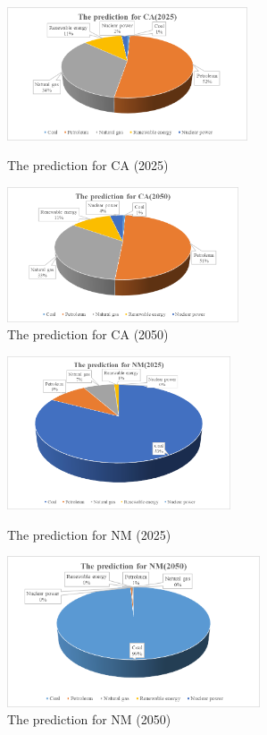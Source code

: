 \documentclass{mcmthesis}
\begin{document}
\begin{figure}
\begin{minipage}[t]{0.5\linewidth}
\centering
\includegraphics[width=2.8in]{./picturec/CAF2025.png}
\caption{The prediction for CA (2025)}
\label{fig:left:17}
\end{minipage}%
\begin{minipage}[t]{0.5\linewidth}
\centering
\includegraphics[width=2.7in]{./picturec/CAF2050.png}
\caption{The prediction for CA (2050)}
\label{fig:right:18}
\end{minipage}
\end{figure}                                           

\begin{figure}
\begin{minipage}[t]{0.5\linewidth}
\centering
\includegraphics[width=2.6in]{./picturec/NMF2025.png}
\caption{The prediction for NM (2025)}
\label{fig:left:19}
\end{minipage}%
\begin{minipage}[t]{0.5\linewidth}
\centering
\includegraphics[width=2.95in]{./picturec/NMF2050.png}
\caption{The prediction for NM (2050)}
\label{fig:right:20}
\end{minipage}
\end{figure}     
\end{document}
